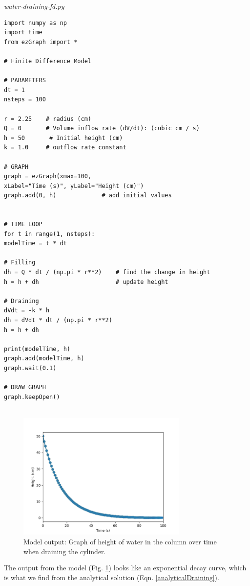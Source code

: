 \documentclass[11pt,fleqn]{article}
\begin{document}
\textit{water-draining-fd.py}
\begin{lstlisting}[frame=single]
import numpy as np 
import time 
from ezGraph import *

# Finite Difference Model

# PARAMETERS
dt = 1
nsteps = 100

r = 2.25    # radius (cm)
Q = 0       # Volume inflow rate (dV/dt): (cubic cm / s)
h = 50       # Initial height (cm)
k = 1.0     # outflow rate constant

# GRAPH
graph = ezGraph(xmax=100, 
xLabel="Time (s)", yLabel="Height (cm)")
graph.add(0, h)             # add initial values


# TIME LOOP
for t in range(1, nsteps):
modelTime = t * dt

# Filling
dh = Q * dt / (np.pi * r**2)    # find the change in height
h = h + dh                      # update height

# Draining
dVdt = -k * h
dh = dVdt * dt / (np.pi * r**2)
h = h + dh

print(modelTime, h)
graph.add(modelTime, h)
graph.wait(0.1)

# DRAW GRAPH
graph.keepOpen()


\end{lstlisting}
	
	
	\begin{figure} 
		\caption{Model output: Graph of height of water in the column over time when draining the cylinder.}
		\centering
		\label{drainingModel}
		\includegraphics[width=0.75\textwidth]{water-draining-fd.png}
	\end{figure}

The output from the model (Fig. \ref{drainingModel}) looks like an exponential decay curve, which is what we find from the analytical solution (Eqn. \ref{analyticalDraining}).

 
\end{document}
